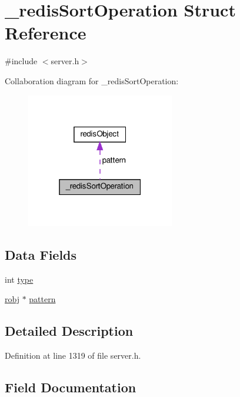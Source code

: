 \hypertarget{struct__redis_sort_operation}{}\section{\+\_\+redis\+Sort\+Operation Struct Reference}
\label{struct__redis_sort_operation}


{\ttfamily \#include $<$server.\+h$>$}



Collaboration diagram for \+\_\+redis\+Sort\+Operation\+:
\nopagebreak
\begin{figure}[H]
\begin{center}
\leavevmode
\includegraphics[width=183pt]{struct__redis_sort_operation__coll__graph}
\end{center}
\end{figure}
\subsection*{Data Fields}
\begin{DoxyCompactItemize}
\item 
int \hyperlink{struct__redis_sort_operation_ac765329451135abec74c45e1897abf26}{type}
\item 
\hyperlink{server_8h_a540f174d2685422fbd7d12e3cd44c8e2}{robj} $\ast$ \hyperlink{struct__redis_sort_operation_a779898a32e09ec217b6876501caecc9c}{pattern}
\end{DoxyCompactItemize}


\subsection{Detailed Description}


Definition at line 1319 of file server.\+h.



\subsection{Field Documentation}
\mbox{\label{struct__redis_sort_operation_a779898a32e09ec217b6876501caecc9c}} 
